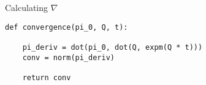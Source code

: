 \begin{algorithm}[ht!]
\caption[Algorithm]{Calculating $\nabla$}
\label{alg:convergence}
\begin{verbatim}
def convergence(pi_0, Q, t):

    pi_deriv = dot(pi_0, dot(Q, expm(Q * t)))
    conv = norm(pi_deriv)

    return conv
\end{verbatim}
\end{algorithm}
